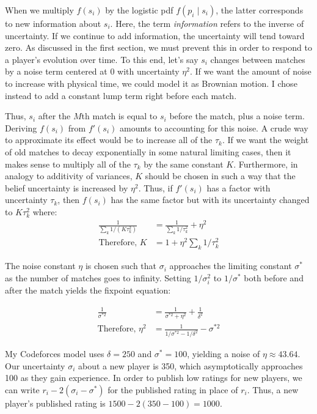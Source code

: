 \documentclass{article}
\begin{document}
When we multiply $f(s_i)$ by the logistic pdf $f(p_i \mid s_i)$, the latter corresponds to new information about $s_i$. Here, the term \emph{information} refers to the inverse of uncertainty. If we continue to add information, the uncertainty will tend toward zero. As discussed in the first section, we must prevent this in order to respond to a player's evolution over time. To this end, let's say $s_i$ changes between matches by a noise term centered at $0$ with uncertainty $\eta^2$. If we want the amount of noise to increase with physical time, we could model it as Brownian motion. I chose instead to add a constant lump term right before each match.

Thus, $s_i$ after the $M$th match is equal to $s_i$ before the match, plus a noise term. Deriving $f(s_i)$ from $f'(s_i)$ amounts to accounting for this noise. A crude way to approximate its effect would be to increase all of the $\tau_k$. If we want the weight of old matches to decay exponentially in some natural limiting cases, then it makes sense to multiply all of the $\tau_k$ by the same constant $K$. Furthermore, in analogy to additivity of variances, $K$ should be chosen in such a way that the belief uncertainty is increased by $\eta^2$. Thus, if $f'(s_i)$ has a factor with uncertainty $\tau_k$, then $f(s_i)$ has the same factor but with its uncertainty changed to $K\tau_k^2$ where:
\begin{align}
\frac{1}{\sum_k 1/(K\tau_k^2)} &= \frac{1}{\sum_k 1/\tau_k^2} + \eta^2
\\ \text{Therefore, }K &= 1 + \eta^2\sum_k 1/\tau_k^2
\end{align}

The noise constant $\eta$ is chosen such that $\sigma_i$ approaches the limiting constant $\sigma^*$ as the number of matches goes to infinity. Setting $1/\sigma_i^2$ to $1/\sigma^*$ both before and after the match yields the fixpoint equation:

\begin{align}
\frac{1}{\sigma^{*2}} &= \frac{1}{\sigma^{*2} + \eta^2} + \frac{1}{\delta^2}
\\ \text{Therefore, }\eta^2 &= \frac{1}{1/\sigma^{*2} - 1/\delta^2} - \sigma^{*2}
\end{align}

My Codeforces model uses $\delta = 250$ and $\sigma^* = 100$, yielding a noise of $\eta \approx 43.64$. Our uncertainty $\sigma_i$ about a new player is 350, which asymptotically approaches 100 as they gain experience. In order to publish low ratings for new players, we can write $r_i - 2(\sigma_i - \sigma^*)$ for the published rating in place of $r_i$. Thus, a new player's published rating is $1500 - 2(350-100) = 1000$.
\end{document}
